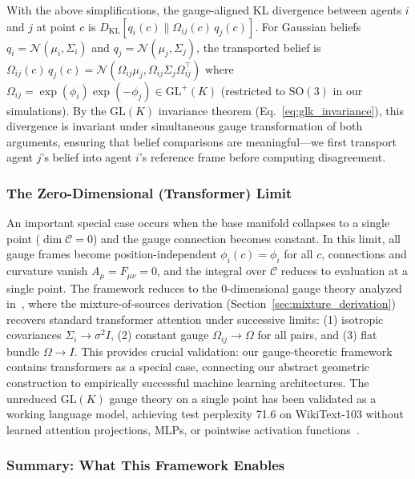 \documentclass[11pt]{article}
\begin{document}
With the above simplifications, the gauge-aligned KL divergence between agents $i$ and $j$ at point $c$ is $D_{\mathrm{KL}}[q_i(c) \| \Omega_{ij}(c)\,q_j(c)]$. For Gaussian beliefs $q_i = \mathcal{N}(\mu_i, \Sigma_i)$ and $q_j = \mathcal{N}(\mu_j, \Sigma_j)$, the transported belief is $\Omega_{ij}(c)\,q_j(c) = \mathcal{N}(\Omega_{ij}\mu_j, \Omega_{ij}\Sigma_j\Omega_{ij}^\top)$ where $\Omega_{ij} = \exp(\phi_i)\exp(-\phi_j) \in \mathrm{GL}^+(K)$ (restricted to $\mathrm{SO}(3)$ in our simulations). By the $\mathrm{GL}(K)$ invariance theorem (Eq.~\ref{eq:glk_invariance}), this divergence is invariant under simultaneous gauge transformation of both arguments, ensuring that belief comparisons are meaningful---we first transport agent $j$'s belief into agent $i$'s reference frame before computing disagreement.

\subsubsection{The Zero-Dimensional (Transformer) Limit}

An important special case occurs when the base manifold collapses to a single point ($\dim\mathcal{C} = 0$) and the gauge connection becomes constant. In this limit, all gauge frames become position-independent $\phi_i(c) = \phi_i$ for all $c$, connections and curvature vanish $A_\mu = F_{\mu\nu} = 0$, and the integral over $\mathcal{C}$ reduces to evaluation at a single point. The framework reduces to the 0-dimensional gauge theory analyzed in~\cite{Dennis2026GL}, where the mixture-of-sources derivation (Section~\ref{sec:mixture_derivation}) recovers standard transformer attention under successive limits: (1) isotropic covariances $\Sigma_i \to \sigma^2 I$, (2) constant gauge $\Omega_{ij} \to \Omega$ for all pairs, and (3) flat bundle $\Omega \to I$. This provides crucial validation: our gauge-theoretic framework contains transformers as a special case, connecting our abstract geometric construction to empirically successful machine learning architectures. The unreduced $\mathrm{GL}(K)$ gauge theory on a single point has been validated as a working language model, achieving test perplexity 71.6 on WikiText-103 without learned attention projections, MLPs, or pointwise activation functions~\cite{Dennis2026GL}.

\subsubsection{Summary: What This Framework Enables}
\end{document}
